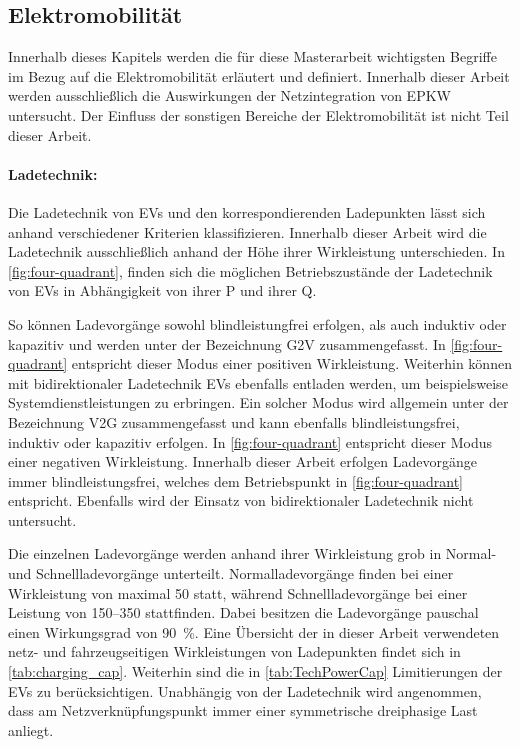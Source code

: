 


\subsection{Elektromobilität}

Innerhalb dieses Kapitels werden die für diese Masterarbeit wichtigsten Begriffe im Bezug auf die Elektromobilität erläutert und definiert.
Innerhalb dieser Arbeit werden ausschließlich die Auswirkungen der Netzintegration von \gls{EPKW} untersucht.
Der Einfluss der sonstigen Bereiche der Elektromobilität ist nicht Teil dieser Arbeit.


\paragraph{Ladetechnik:}

Die Ladetechnik von \glspl{EV} und den korrespondierenden Ladepunkten lässt sich anhand verschiedener Kriterien klassifizieren.
Innerhalb dieser Arbeit wird die Ladetechnik ausschließlich anhand der Höhe ihrer Wirkleistung unterschieden.
In \autoref{fig:four-quadrant}, finden sich die möglichen Betriebszustände der Ladetechnik von \glspl{EV} in Abhängigkeit von ihrer \gls{P} und ihrer \gls{Q}.



So können Ladevorgänge sowohl blindleistungfrei erfolgen, als auch induktiv oder kapazitiv und werden unter der Bezeichnung \gls{G2V} zusammengefasst.
In \autoref{fig:four-quadrant} entspricht dieser Modus einer positiven Wirkleistung.
Weiterhin können mit bidirektionaler Ladetechnik \glspl{EV} ebenfalls entladen werden, um beispielsweise Systemdienstleistungen zu erbringen.
Ein solcher Modus wird allgemein unter der Bezeichnung \gls{V2G} zusammengefasst und kann ebenfalls blindleistungsfrei, induktiv oder kapazitiv erfolgen.
In \autoref{fig:four-quadrant} entspricht dieser Modus einer negativen Wirkleistung. \cite{He2020} 
Innerhalb dieser Arbeit erfolgen Ladevorgänge immer blindleistungsfrei, welches dem Betriebspunkt in \autoref{fig:four-quadrant} entspricht.
Ebenfalls wird der Einsatz von bidirektionaler Ladetechnik nicht untersucht.\medskip

Die einzelnen Ladevorgänge werden anhand ihrer Wirkleistung grob in Normal- und Schnellladevorgänge unterteilt.
Normalladevorgänge finden bei einer Wirkleistung von maximal \SI{50}{\kw} statt, während Schnellladevorgänge bei einer Leistung von \SIrange[range-phrase=~{oder}~]{150}{350}{\kw} stattfinden.
Dabei besitzen die Ladevorgänge pauschal einen Wirkungsgrad von \SI{90}{\percent}.
Eine Übersicht der in dieser Arbeit verwendeten netz- und fahrzeugseitigen Wirkleistungen von Ladepunkten findet sich in \autoref{tab:charging_cap}.
Weiterhin sind die in \autoref{tab:TechPowerCap} Limitierungen der \glspl{EV} zu berücksichtigen.
Unabhängig von der Ladetechnik wird angenommen, dass am Netzverknüpfungspunkt immer einer symmetrische dreiphasige Last anliegt.

